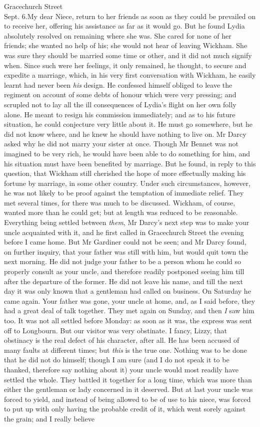 \begin{mail}{Gracechurch Street\\ Sept. 6.}{My dear Niece,}
return to her friends as soon as they could be prevailed on to receive her, offering his assistance as far as it would go. But he found Lydia absolutely resolved on remaining where she was. She cared for none of her friends; she wanted no help of his; she would not hear of leaving Wickham. She was sure they should be married some time or other, and it did not much signify when. Since such were her feelings, it only remained, he thought, to secure and expedite a marriage, which, in his very first conversation with Wickham, he easily learnt had never been \textit{his} design. He confessed himself obliged to leave the regiment on account of some debts of honour which were very pressing; and scrupled not to lay all the ill consequences of Lydia's flight on her own folly alone. He meant to resign his commission immediately; and as to his future situation, he could conjecture very little about it. He must go somewhere, but he did not know where, and he knew he should have nothing to live on. Mr Darcy asked why he did not marry your sister at once. Though Mr Bennet was not imagined to be very rich, he would have been able to do something for him, and his situation must have been benefited by marriage. But he found, in reply to this question, that Wickham still cherished the hope of more effectually making his fortune by marriage, in some other country. Under such circumstances, however, he was not likely to be proof against the temptation of immediate relief. They met several times, for there was much to be discussed. Wickham, of course, wanted more than he could get; but at length was reduced to be reasonable. Everything being settled between \textit{them}, Mr Darcy's next step was to make your uncle acquainted with it, and he first called in Gracechurch Street the evening before I came home. But Mr Gardiner could not be seen; and Mr Darcy found, on further inquiry, that your father was still with him, but would quit town the next morning. He did not judge your father to be a person whom he could so properly consult as your uncle, and therefore readily postponed seeing him till after the departure of the former. He did not leave his name, and till the next day it was only known that a gentleman had called on business. On Saturday he came again. Your father was gone, your uncle at home, and, as I said before, they had a great deal of talk together. They met again on Sunday, and then \textit{I} saw him too. It was not all settled before Monday: as soon as it was, the express was sent off to Longbourn. But our visitor was very obstinate. I fancy, Lizzy, that obstinacy is the real defect of his character, after all. He has been accused of many faults at different times; but \textit{this} is the true one. Nothing was to be done that he did not do himself; though I am sure (and I do not speak it to be thanked, therefore say nothing about it) your uncle would most readily have settled the whole. They battled it together for a long time, which was more than either the gentleman or lady concerned in it deserved. But at last your uncle was forced to yield, and instead of being allowed to be of use to his niece, was forced to put up with only having the probable credit of it, which went sorely against the grain; and I really believe 
\end{mail}
